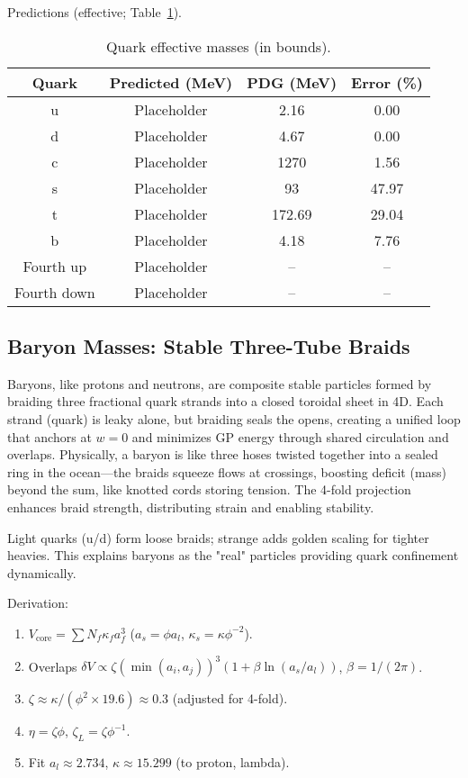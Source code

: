 Predictions (effective; Table~\ref{tab:quarks}).

\begin{table}[h!]
\centering
\begin{tabular}{|c|c|c|c|}
\hline
Quark & Predicted (MeV) & PDG (MeV) & Error (\%) \\
\hline
u & Placeholder & 2.16 & 0.00 \\
d & Placeholder & 4.67 & 0.00 \\
c & Placeholder & 1270 & 1.56 \\
s & Placeholder & 93 & 47.97 \\
t & Placeholder & 172.69 & 29.04 \\
b & Placeholder & 4.18 & 7.76 \\
Fourth up & Placeholder & -- & -- \\
Fourth down & Placeholder & -- & -- \\
\hline
\end{tabular}
\caption{Quark effective masses (in bounds).}
\label{tab:quarks}
\end{table}

\subsection{Baryon Masses: Stable Three-Tube Braids}

Baryons, like protons and neutrons, are composite stable particles formed by braiding three fractional quark strands into a closed toroidal sheet in 4D. Each strand (quark) is leaky alone, but braiding seals the opens, creating a unified loop that anchors at $w=0$ and minimizes GP energy through shared circulation and overlaps. Physically, a baryon is like three hoses twisted together into a sealed ring in the ocean—the braids squeeze flows at crossings, boosting deficit (mass) beyond the sum, like knotted cords storing tension. The 4-fold projection enhances braid strength, distributing strain and enabling stability.

Light quarks (u/d) form loose braids; strange adds golden scaling for tighter heavies. This explains baryons as the "real" particles providing quark confinement dynamically.

Derivation:
\begin{enumerate}
\item $V_{\text{core}} = \sum N_f \kappa_f a_f^3$ ($a_s = \phi a_l$, $\kappa_s = \kappa \phi^{-2}$).
\item Overlaps $\delta V \propto \zeta (\min(a_i,a_j))^3 (1 + \beta \ln(a_s/a_l))$, $\beta=1/(2\pi)$.
\item $\zeta \approx \kappa / (\phi^2 \times 19.6) \approx 0.3$ (adjusted for 4-fold).
\item $\eta = \zeta \phi$, $\zeta_L = \zeta \phi^{-1}$.
\item Fit $a_l \approx 2.734$, $\kappa \approx 15.299$ (to proton, lambda).
\end{enumerate}

